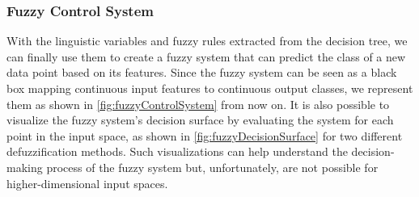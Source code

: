 \subsubsection{Fuzzy Control System}

With the linguistic variables and fuzzy rules extracted from the decision tree, we can finally use them to create a fuzzy system that can predict the class of a new data point based on its features. Since the fuzzy system can be seen as a black box mapping continuous input features to continuous output classes, we represent them as shown in \autoref{fig:fuzzyControlSystem} from now on. It is also possible to visualize the fuzzy system's decision surface by evaluating the system for each point in the input space, as shown in \autoref{fig:fuzzyDecisionSurface} for two different defuzzification methods. Such visualizations can help understand the decision-making process of the fuzzy system but, unfortunately, are not possible for higher-dimensional input spaces.


